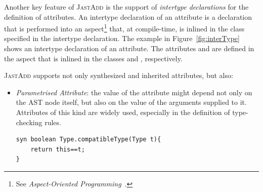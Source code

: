 Another key feature of \textsc{JastAdd}  is the support of \emph{intertype declarations} for the definition of attributes.
An intertype declaration of an attribute is a declaration that is performed into
an aspect\footnote{See \emph{Aspect-Oriented Programming}~\cite{Kiczales1997Aspect}.} that, at compile-time,
is inlined in the class specified in the intertype declaration. The example in Figure~\ref{fig:interType}
shows an intertype declaration of an attribute.
The attributes  and  are defined in the aspect 
that is inlined in the classes  and , respectively.

\textsc{JastAdd} supports not only synthesized and inherited attributes, but also:
\begin{itemize}
    \item \emph{Parametrised Attribute}: the value of the attribute might depend
    not only on the AST node itself, but also on the value of the arguments supplied
    to it. Attributes of this kind are widely used, especially in the definition of
    type-checking rules.
    \begin{lstlisting}[language=JastAdd]
syn boolean Type.compatibleType(Type t){
    return this==t;
}
    \end{lstlisting}


\end{itemize}
